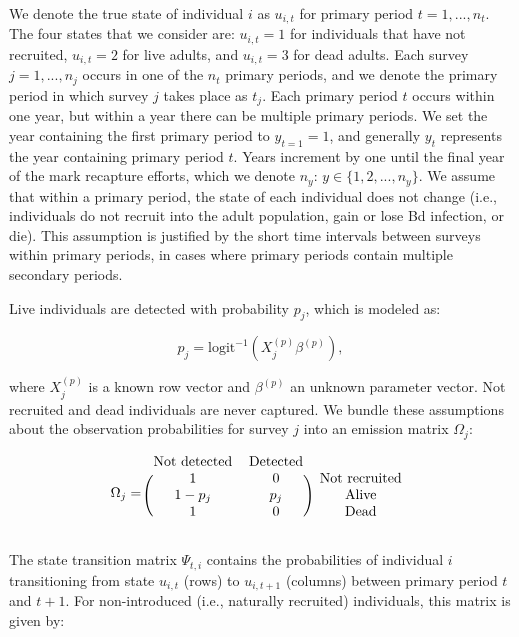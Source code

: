 \documentclass[9pt,twoside,lineno]{pnas-new}
\begin{document}
We denote the true state of individual \(i\) as \(u_{i, t}\) for primary
period \(t = 1,..., n_t\). The four states that we consider are:
\(u_{i, t} = 1\) for individuals that have not recruited,
\(u_{i, t} =2\) for live adults, and \(u_{i, t} = 3\) for dead adults.
Each survey \(j=1, ..., n_j\) occurs in one of the \(n_t\) primary
periods, and we denote the primary period in which survey \(j\) takes
place as \(t_j\). Each primary period \(t\) occurs within one year, but
within a year there can be multiple primary periods. We set the year
containing the first primary period to \(y_{t = 1} = 1\), and generally
\(y_t\) represents the year containing primary period \(t\). Years
increment by one until the final year of the mark recapture efforts,
which we denote \(n_y\): \(y \in \{1, 2, ..., n_y\}\). We assume that
within a primary period, the state of each individual does not change
(i.e., individuals do not recruit into the adult population, gain or
lose Bd infection, or die). This assumption is justified by the short
time intervals between surveys within primary periods, in cases where
primary periods contain multiple secondary periods.

Live individuals are detected with probability \(p_j\), which is modeled
as:

\[p_j = \text{logit}^{-1}(X_j^{(p)} \beta^{(p)}),\]

where \(X_j^{(p)}\) is a known row vector and \(\beta^{(p)}\) an unknown
parameter vector. Not recruited and dead individuals are never captured.
We bundle these assumptions about the observation probabilities for
survey \(j\) into an emission matrix \(\Omega_j\):

\[
\Omega_j =
\begin{blockarray}{ccc}
  \text{Not detected} & \text{Detected} \\
\begin{block}{(cc)c}
  1 & 0 & \text{Not recruited} \\
  1 - p_j & p_j & \text{Alive} \\
  1 & 0 & \text{Dead} \\
\end{block}
\end{blockarray}
\]

The state transition matrix \(\Psi_{t, i}\) contains the probabilities
of individual \(i\) transitioning from state \(u_{i, t}\) (rows) to
\(u_{i, t+1}\) (columns) between primary period \(t\) and \(t+1\). For
non-introduced (i.e., naturally recruited) individuals, this matrix is
given by:
\end{document}
